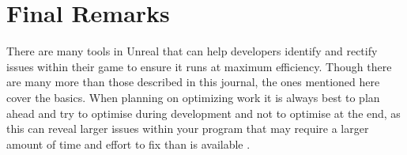 \documentclass{scrartcl}
\begin{document}
\section{Final Remarks}
There are many tools in Unreal that can help developers identify and rectify issues within their game to ensure it runs at maximum efficiency. Though there are many more than those described in this journal, the ones mentioned here cover the basics. When planning on optimizing work it is always best to plan ahead and try to optimise during development and not to optimise at the end, as this can reveal larger issues within your program that may require a larger amount of time and effort to fix than is available \cite{UEPerformance}.
	
	
	
	
	
	
\end{document}
